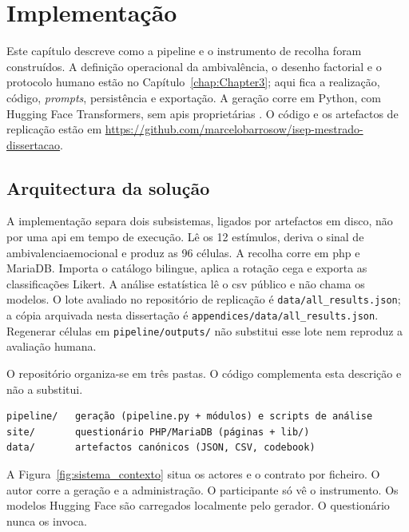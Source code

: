 
\chapter{Implementação}
\label{chap:Chapter4}

Este capítulo descreve como a \gls{pipeline} e o instrumento de recolha foram construídos. A definição operacional da ambivalência, o desenho factorial e o protocolo humano estão no Capítulo~\ref{chap:Chapter3}; aqui fica a realização, código, \textit{prompts}, persistência e exportação. A geração corre em Python, com Hugging Face Transformers, sem \glspl{api} proprietárias \parencite{Wolf2020Transformers}. O código e os artefactos de replicação estão em \url{https://github.com/marcelobarrosow/isep-mestrado-dissertacao}.


\section{Arquitectura da solução}
\label{sec:impl_arquitectura}

A implementação separa dois subsistemas, ligados por artefactos em disco, não por uma \gls{api} em tempo de execução. Lê os 12 estímulos, deriva o sinal de \gls{ambivalenciaemocional} e produz as 96 células. A recolha corre em \gls{php} e MariaDB. Importa o catálogo bilingue, aplica a rotação cega e exporta as classificações Likert. A análise estatística lê o \gls{csv} público e não chama os modelos. O lote avaliado no repositório de replicação é \texttt{data/all\_results.json}; a cópia arquivada nesta dissertação é \texttt{appendices/data/all\_results.json}. Regenerar células em \texttt{pipeline/outputs/} não substitui esse lote nem reproduz a avaliação humana.

O repositório organiza-se em três pastas. O código complementa esta descrição e não a substitui.

\begin{verbatim}
pipeline/   geração (pipeline.py + módulos) e scripts de análise
site/       questionário PHP/MariaDB (páginas + lib/)
data/       artefactos canónicos (JSON, CSV, codebook)
\end{verbatim}

A Figura~\ref{fig:sistema_contexto} situa os actores e o contrato por ficheiro. O autor corre a geração e a administração. O participante só vê o instrumento. Os modelos Hugging Face são carregados localmente pelo gerador. O questionário nunca os invoca.


